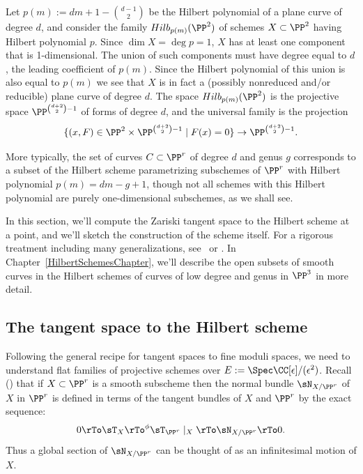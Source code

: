 \begin{example}\label{Hilb for plane curves}
Let $p(m) := dm+1-{d-1\choose 2}$ be the Hilbert polynomial of a plane curve of degree $d$, and consider the family $Hilb_{p(m)}(\PP^2)$ of schemes $X \subset \PP^{2}$ having Hilbert polynomial $p$. Since 
$\dim X = \deg p = 1$, $X$ has at least one component that is 1-dimensional. The union of such components must have degree
equal to $d$, the leading coefficient of $p(m)$. Since the Hilbert polynomial  of this union is also equal
to $p(m)$ we see that $X$ is in fact a (possibly nonreduced and/or reducible) plane curve of degree $d$. The space $Hilb_{p(m)}(\PP^2)$ is the projective space $\PP^{{d+2\choose 2}-1}$ of forms of degree $d$,
and the universal family is the projection 
$$
\{(x,F) \in \PP^2 \times \PP^{{d+2\choose 2}-1} \mid F(x) = 0\} \to \PP^{{d+2\choose 2}-1}.
$$

More typically, the set of curves $C \subset \PP^r$ of degree $d$ and genus $g$ corresponds to a subset of the Hilbert scheme parametrizing subschemes of $\PP^r$ with Hilbert polynomial $p(m) = dm - g + 1$, though not all schemes with this Hilbert polynomial are purely one-dimensional subschemes, as we shall see.
\end{example}
 
 In this section, we'll compute 
 the Zariski tangent space to the Hilbert scheme at a point,  and we'll sketch the construction of the scheme itself. For a rigorous treatment including many generalizations,  see~\cite{HomogHilbert} or \cite{MR2222646}. In Chapter~\ref{HilbertSchemesChapter}, we'll describe  the
 open subsets of smooth curves in the Hilbert schemes of curves of low degree and genus in $\PP^3$ in more detail. 

\subsection{The tangent space to the Hilbert scheme}\label{tan hilbert section}

Following the general recipe for tangent spaces to fine moduli spaces, we need to understand flat families
of projective schemes over $E := \Spec \CC[\eps]/(\eps^2)$. Recall (\cite[p.182]{Hartshorne1977}) that if $X\subset \PP^r$ is a smooth subscheme then
 the normal bundle $\sN_{X/\PP^r}$ of $X$ in $\PP^r$ is defined in terms of the tangent bundles
 of $X$ and $\PP^r$ by the exact sequence: 
$$
0\rTo \sT_X \rTo^{\phi} \sT_{\PP^r}\mid_X \rTo \sN_{X/\PP^r} \rTo 0.
$$
Thus a global section of 
$\sN_{X/\PP^r}$
can be thought of as an infinitesimal motion of $X$.

